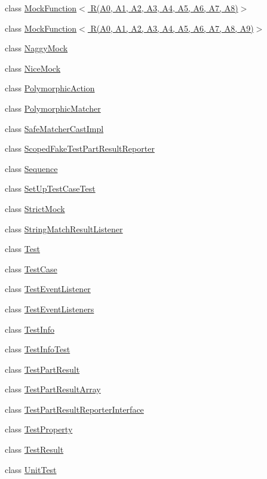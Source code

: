 \begin{DoxyCompactItemize}
\item 
class \hyperlink{classtesting_1_1_mock_function_3_01_r_07_a0_00_01_a1_00_01_a2_00_01_a3_00_01_a4_00_01_a5_00_01_a6_00_01_a7_00_01_a8_08_4}{Mock\+Function$<$ R(\+A0, A1, A2, A3, A4, A5, A6, A7, A8)$>$}
\item 
class \hyperlink{classtesting_1_1_mock_function_3_01_r_07_a0_00_01_a1_00_01_a2_00_01_a3_00_01_a4_00_01_a5_00_01_a654a9d62da83bde10dfec0368733bb48}{Mock\+Function$<$ R(\+A0, A1, A2, A3, A4, A5, A6, A7, A8, A9)$>$}
\item 
class \hyperlink{classtesting_1_1_naggy_mock}{Naggy\+Mock}
\item 
class \hyperlink{classtesting_1_1_nice_mock}{Nice\+Mock}
\item 
class \hyperlink{classtesting_1_1_polymorphic_action}{Polymorphic\+Action}
\item 
class \hyperlink{classtesting_1_1_polymorphic_matcher}{Polymorphic\+Matcher}
\item 
class \hyperlink{classtesting_1_1_safe_matcher_cast_impl}{Safe\+Matcher\+Cast\+Impl}
\item 
class \hyperlink{classtesting_1_1_scoped_fake_test_part_result_reporter}{Scoped\+Fake\+Test\+Part\+Result\+Reporter}
\item 
class \hyperlink{classtesting_1_1_sequence}{Sequence}
\item 
class \hyperlink{classtesting_1_1_set_up_test_case_test}{Set\+Up\+Test\+Case\+Test}
\item 
class \hyperlink{classtesting_1_1_strict_mock}{Strict\+Mock}
\item 
class \hyperlink{classtesting_1_1_string_match_result_listener}{String\+Match\+Result\+Listener}
\item 
class \hyperlink{classtesting_1_1_test}{Test}
\item 
class \hyperlink{classtesting_1_1_test_case}{Test\+Case}
\item 
class \hyperlink{classtesting_1_1_test_event_listener}{Test\+Event\+Listener}
\item 
class \hyperlink{classtesting_1_1_test_event_listeners}{Test\+Event\+Listeners}
\item 
class \hyperlink{classtesting_1_1_test_info}{Test\+Info}
\item 
class \hyperlink{classtesting_1_1_test_info_test}{Test\+Info\+Test}
\item 
class \hyperlink{classtesting_1_1_test_part_result}{Test\+Part\+Result}
\item 
class \hyperlink{classtesting_1_1_test_part_result_array}{Test\+Part\+Result\+Array}
\item 
class \hyperlink{classtesting_1_1_test_part_result_reporter_interface}{Test\+Part\+Result\+Reporter\+Interface}
\item 
class \hyperlink{classtesting_1_1_test_property}{Test\+Property}
\item 
class \hyperlink{classtesting_1_1_test_result}{Test\+Result}
\item 
class \hyperlink{classtesting_1_1_unit_test}{Unit\+Test}
\end{DoxyCompactItemize}
